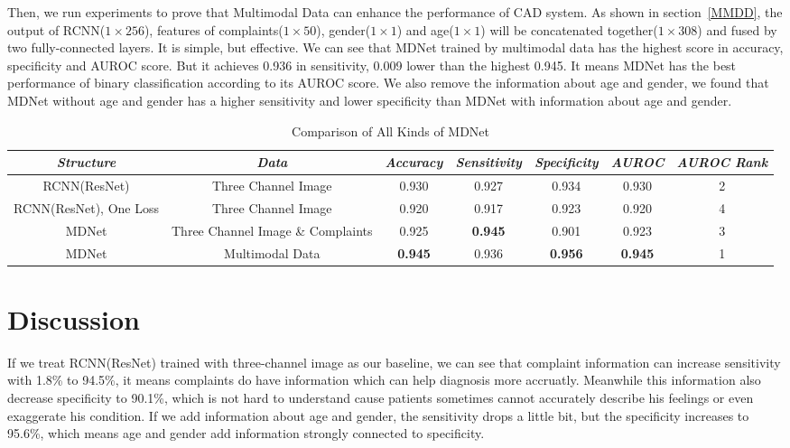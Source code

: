 \documentclass[journal]{IEEEtran}
\begin{document}
Then, we run experiments to prove that Multimodal Data can enhance the performance of CAD system. As shown in section~\ref{MMDD}, the output of RCNN($1 \times 256$), features of complaints($1 \times 50$), gender($1 \times 1$) and age($1 \times 1$) will be concatenated together($1 \times 308$) and fused by two fully-connected layers. It is simple, but effective. We can see that MDNet trained by multimodal data has the highest score in accuracy, specificity and AUROC score. But it achieves 0.936 in sensitivity, 0.009 lower than the highest 0.945. It means MDNet has the best performance of binary classification according to its AUROC score. We also remove the information about age and gender, we found that MDNet without age and gender has a higher sensitivity and lower specificity than MDNet with information about age and gender. 
\begin{table}[htb]
\vspace{-0cm}
\caption{Comparison of All Kinds of MDNet}
\vspace{-0cm}
\begin{center}
\begin{tabular}{|c|c|c|c|c|c|c|}
\hline
\textbf{\textit{Structure}} & \textbf{\textit{Data}}& \textbf{\textit{Accuracy}}  & \textbf{\textit{Sensitivity}} & \textbf{\textit{Specificity}} & \textbf{\textit{AUROC}}& \textbf{\textit{AUROC Rank}}\\
\hline
RCNN(ResNet) & Three Channel Image& 0.930 & 0.927 & 0.934 & 0.930 &2\\
RCNN(ResNet), One Loss & Three Channel Image& 0.920 & 0.917 & 0.923 & 0.920 &4\\
MDNet & Three Channel Image \& Complaints & 0.925 & {\bfseries 0.945} & 0.901 & 0.923 &3\\
MDNet & Multimodal Data&  {\bfseries 0.945} & 0.936 & {\bfseries 0.956} & {\bfseries 0.945} &1\\
\hline
\end{tabular}
\vspace{-0cm}
\label{comparison}
\end{center}
\vspace{-0cm}
\end{table}
    


\section{Discussion}
\label{discuss}
If we treat RCNN(ResNet) trained with three-channel image as our baseline, we can see that complaint information can increase sensitivity with 1.8\% to 94.5\%, it means complaints do have information which can help diagnosis more accruatly. Meanwhile this information also decrease specificity to 90.1\%, which is not hard to understand cause patients sometimes cannot accurately describe his feelings or even exaggerate his condition. If we add information about age and gender, the sensitivity drops a little bit, but the specificity increases to 95.6\%, which means age and gender add information strongly connected to specificity.
\end{document}
